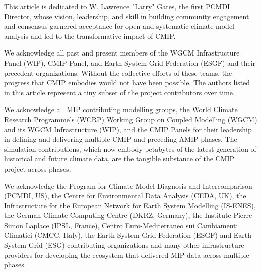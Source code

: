 \documentclass[manuscript]{copernicus}
\begin{document}


\begin{acknowledgements}

This article is dedicated to W. Lawrence "Larry" Gates, the first PCMDI Director, whose vision, leadership, and skill in building community engagement and consensus garnered acceptance for open and systematic climate model analysis and led to the transformative impact of CMIP.

We acknowledge all past and present members of the WGCM Infrastructure Panel (WIP), CMIP Panel, and Earth System Grid Federation (ESGF) and their precedent organizations. Without the collective efforts of these teams, the progress that CMIP embodies would not have been possible. The authors listed in this article represent a tiny subset of the project contributors over time.

We acknowledge all MIP contributing modelling groups, the World Climate Research Programme's (WCRP) Working Group on Coupled Modelling (WGCM) and its WGCM Infrastructure (WIP), and the CMIP Panels for their leadership in defining and delivering multiple CMIP and preceding AMIP phases. The simulation contributions, which now embody petabytes of the latest generation of historical and future climate data, are the tangible substance of the CMIP project across phases.

We acknowledge the Program for Climate Model Diagnosis and Intercomparison (PCMDI, US), the Centre for Environmental Data Analysis (CEDA, UK), the Infrastructure for the European Network for Earth System Modelling (IS-ENES), the German Climate Computing Centre (DKRZ, Germany), the Institute Pierre-Simon Laplace (IPSL, France), Centro Euro-Mediterraneo sui Cambiamenti Climatici (CMCC, Italy), the Earth System Grid Federation (ESGF) and Earth System Grid (ESG) contributing organizations and many other infrastructure providers for developing the ecosystem that delivered MIP data across multiple phases.


\end{acknowledgements}
\end{document}
